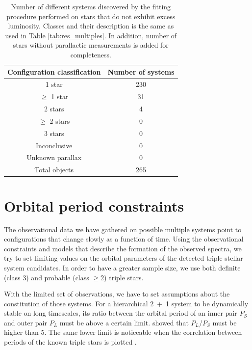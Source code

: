 \begin{table}
	\centering
	\caption{Number of different systems discovered by the fitting procedure performed on stars that do not exhibit excess luminosity. Classes and their description is the same as used in Table \ref{tab:res_multiples}. In addition, number of stars without parallactic measurements is added for completeness.}
	\begin{tabular}{c c}
		\hline
		Configuration classification & Number of systems \\ 
		\hline
		1 star & 230 \\
		$\geq$ 1 star & 31 \\
		2 stars & 4 \\
		$\geq$ 2 stars & 0 \\
		3 stars & 0 \\
		Inconclusive & 0 \\
		Unknown parallax & 0 \\
		\hline
		Total objects & 265 \\
		\hline
	\end{tabular}
	\label{tab:res_single}
\end{table}


\section{Orbital period constraints}
\label{sec:orital_periods}
The observational data we have gathered on possible multiple systems point to configurations that change slowly as a function of time. Using the observational constraints and models that describe the formation of the observed spectra, we try to set limiting values on the orbital parameters of the detected triple stellar system candidates. In order to have a greater sample size, we use both definite (class 3) and probable (class $\geq$2) triple stars.

With the limited set of observations, we have to set assumptions about the constitution of those systems. For a hierarchical 2~+~1 system to be dynamically stable on long timescales, its ratio between the orbital period of an inner pair $P_S$ and outer pair $P_L$ must be above a certain limit. \citet{2006epbm.book.....E} showed that $P_L$/$P_S$ must be higher than 5. The same lower limit is noticeable when the correlation between periods of the known triple stars is plotted \citep{2008MNRAS.389..925T, 2018ApJS..235....6T}.

